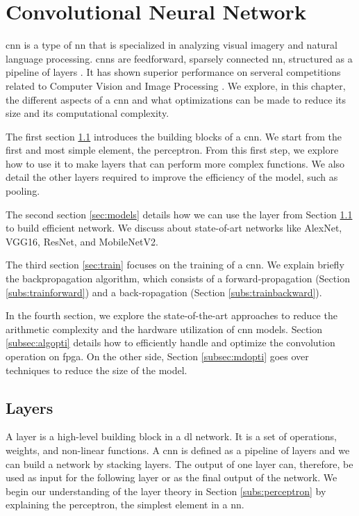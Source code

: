 \chapter{Convolutional Neural Network} \label{chap:cnn}
\acrshort{cnn} is a type of \acrshort{nn} that is specialized in analyzing visual imagery and natural language processing. \acrshort{cnn}s are feedforward, sparsely connected \acrshort{nn}, structured as a pipeline of layers \cite{abdelouahab_accelerating_2018}. It has shown superior performance on serveral competitions related to Computer Vision and Image Processing \cite{khan_survey_2020}. We explore, in this chapter, the different aspects of a \acrshort{cnn} and what optimizations can be made to reduce its size and its computational complexity.

The first section \ref{sec:layer} introduces the building blocks of a \acrshort{cnn}. We start from the first and most simple element, the perceptron. From this first step, we explore how to use it to make layers that can perform more complex functions. We also detail the other layers required to improve the efficiency of the model, such as pooling.

The second section \ref{sec:models} details how we can use the layer from Section \ref{sec:layer} to build efficient network. We discuss about state-of-art networks like AlexNet, VGG16, ResNet, and MobileNetV2.

The third section \ref{sec:train} focuses on the training of a \acrshort{cnn}. We explain briefly the backpropagation algorithm, which consists of a forward-propagation (Section \ref{subs:trainforward}) and a back-ropagation (Section \ref{subs:trainbackward}).

In the fourth section, we explore the state-of-the-art approaches to reduce the arithmetic complexity and the hardware utilization of \acrshort{cnn} models. Section \ref{subsec:algopti} details how to efficiently handle and optimize the convolution operation on \acrshort{fpga}. On the other side, Section \ref{subsec:mdopti} goes over techniques to reduce the size of the model.
%
%
\section{Layers} \label{sec:layer}
A layer is a high-level building block in a \acrshort{dl} network. It is a set of operations, weights, and non-linear functions. A \acrshort{cnn} is defined as a pipeline of layers and we can build a network by stacking layers. The output of one layer can, therefore, be used as input for the following layer or as the final output of the network. We begin our understanding of the layer theory in Section \ref{subs:perceptron} by explaining the perceptron, the simplest element in a \acrshort{nn}.
%
%

%

%

%

%

%

%
%
